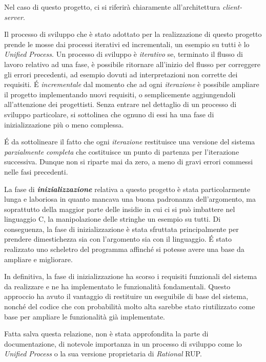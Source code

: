 \documentclass[paper=a4, oneside, fontsize=14pt, titlepage]{article}
\begin{document}
		\begin{flushleft}
			Nel caso di questo progetto, ci si riferirà chiaramente all'architettura \textit{client-server}.\newline
			
			Il processo di sviluppo che è stato adottato per la realizzazione di questo progetto prende le mosse dai processi iterativi ed incrementali, un esempio su tutti è lo \textit{Unified Process}. Un processo di sviluppo è \textit{iterativo} se, terminato il flusso di lavoro relativo ad una fase, è possibile ritornare all'inizio del flusso per correggere gli errori precedenti, ad esempio dovuti ad interpretazioni non corrette dei requisiti. \'{E} \textit{incrementale} dal momento che ad ogni \textit{iterazione} è possibile ampliare il progetto implementando nuovi requisiti, o semplicemente aggiungendoli all'attenzione dei progettisti. Senza entrare nel dettaglio di un processo di sviluppo particolare, si sottolinea che ognuno di essi ha una fase di inizializzazione più o meno complessa.\newline
			
			\'{E} da sottolineare il fatto che ogni \textit{iterazione} restituisce una versione del sistema \textit{parzialmente completa} che costituisce un punto di partenza per l'iterazione successiva. Dunque non si riparte mai da zero, a meno di gravi errori commessi nelle fasi precedenti.\newline
			
			La fase di \textit{\textbf{inizializzazione}} relativa a questo progetto è stata particolarmente lunga e laboriosa in quanto mancava una buona padronanza dell'argomento, ma soprattutto della maggior parte delle insidie in cui ci si può imbattere nel linguaggio C, la manipolazione delle stringhe un esempio su tutti.\newline
			Di conseguenza, la fase di inizializzazione è stata sfruttata principalmente per prendere dimestichezza sia con l'argomento sia con il linguaggio. \'{E} stato realizzato uno scheletro del programma affinché si potesse avere una base da ampliare e migliorare.\newline
			
			In definitiva, la fase di inizializzazione ha scorso i requisiti funzionali del sistema da realizzare e ne ha implementato le funzionalità fondamentali. Questo approccio ha avuto il vantaggio di restituire un eseguibile di base del sistema, nonché del codice che con probabilità molto alta sarebbe stato riutilizzato come base per ampliare le funzionalità già implementate.\newline
			
			Fatta salva questa relazione, non è stata approfondita la parte di documentazione, di notevole importanza in un processo di sviluppo come lo \textit{Unified Process} o la sua versione proprietaria di \textit{Rational} RUP.	
		\end{flushleft}
		
\end{document}

